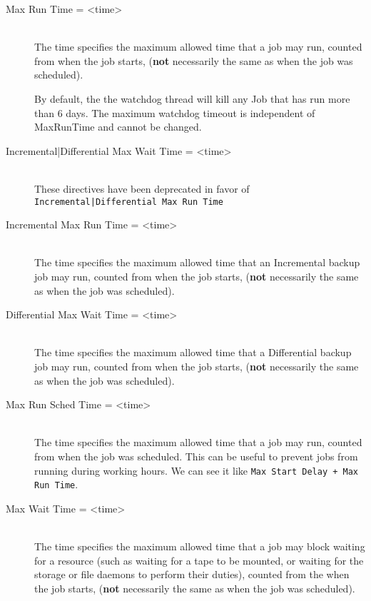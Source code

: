 \begin{description}
\item [Max Run Time = {\textless}time{\textgreater}] \hfill \\
The time specifies the maximum allowed time that a job may run, counted
from when the job starts, ({\bf not} necessarily the same as when the
job was scheduled).

By default, the the watchdog thread will kill any Job that has run more
than 6 days.  The maximum watchdog timeout is independent of MaxRunTime
and cannot be changed.

\item [Incremental|Differential Max Wait Time = {\textless}time{\textgreater}] \hfill \\
These directives have been deprecated in favor of
\texttt{Incremental|Differential Max Run Time}

\item [Incremental Max Run Time = {\textless}time{\textgreater}] \hfill \\
The time specifies the maximum allowed time that an Incremental backup job may
run, counted from when the job starts, ({\bf not} necessarily the same as when
the job was scheduled).

\item [Differential Max Wait Time = {\textless}time{\textgreater}] \hfill \\
The time specifies the maximum allowed time that a Differential backup job may
run, counted from when the job starts, ({\bf not} necessarily the same as when
the job was scheduled).

\item [Max Run Sched Time = {\textless}time{\textgreater}] \hfill \\
The time specifies the maximum allowed time that a job may run, counted from
when the job was scheduled. This can be useful to prevent jobs from running
during working hours. We can see it like \texttt{Max Start Delay + Max Run
Time}.

\item [Max Wait Time = {\textless}time{\textgreater}] \hfill \\
The time specifies the maximum allowed time that a job may block waiting
for a resource (such as waiting for a tape to be mounted, or waiting for
the storage or file daemons to perform their duties), counted from the
when the job starts, ({\bf not} necessarily the same as when the job was
scheduled).


\end{description}
